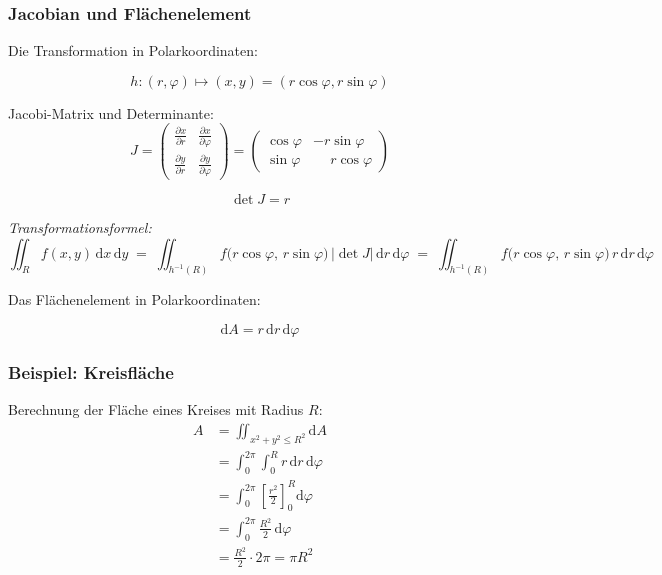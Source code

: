 \documentclass[a4paper,11pt,oneside,open=any,parskip=half, DIV=15]{scrreprt}
\begin{document}
   \subsubsection*{Jacobian und Flächenelement}

      Die Transformation in Polarkoordinaten:
      \begin{importantbox}
      \[
      h: (r,\varphi) \mapsto (x,y) = (r\cos\varphi, r\sin\varphi)
      \]
      \end{importantbox}

      Jacobi-Matrix und Determinante:
      \[
      J = \begin{pmatrix}
      \frac{\partial x}{\partial r} & \frac{\partial x}{\partial \varphi} \\[8pt]
      \frac{\partial y}{\partial r} & \frac{\partial y}{\partial \varphi}
      \end{pmatrix}
      = \begin{pmatrix}
      \cos\varphi & -r\sin\varphi \\[6pt]
      \sin\varphi & \phantom{-}r\cos\varphi
      \end{pmatrix}
      \]

      \begin{importantbox}
      \[
      \det J = r
      \]
      \end{importantbox}

      \textit{Transformationsformel: }\,
         \[
            \iint_{R} f(x,y)\,\mathrm{d}x\,\mathrm{d}y
            \;=\;
            \iint_{h^{-1}(R)} f\!\bigl(r\cos\varphi,\,r\sin\varphi\bigr)\,\bigl|\det J\bigr|\,\mathrm{d}r\,\mathrm{d}\varphi
            \;=\;
            \iint_{h^{-1}(R)} f\!\bigl(r\cos\varphi,\,r\sin\varphi\bigr)\, r \,\mathrm{d}r\,\mathrm{d}\varphi
         \]

      Das Flächenelement in Polarkoordinaten:
      \begin{importantbox}
         \[
            \mathrm{d}A = r \, \mathrm{d}r \, \mathrm{d}\varphi
         \]
      \end{importantbox}

   \subsubsection*{Beispiel: Kreisfläche}

      Berechnung der Fläche eines Kreises mit Radius \(R\):
      \begin{align*}
         A &= \iint_{x^2+y^2 \leq R^2} \mathrm{d}A \tag{Grundformel aufstellen}\\[6pt]
         &= \int_{0}^{2\pi} \int_{0}^{R} r \, \mathrm{d}r \, \mathrm{d}\varphi \tag{Grenzen einsetzen}\\[6pt]
         &= \int_{0}^{2\pi} \left[ \frac{r^2}{2} \right]_{0}^{R} \mathrm{d}\varphi \tag{Integrale berechnen}\\[6pt]
         &= \int_{0}^{2\pi} \frac{R^2}{2} \, \mathrm{d}\varphi\\[6pt]
         &= \frac{R^2}{2} \cdot 2\pi = \pi R^2
      \end{align*}
\end{document}
